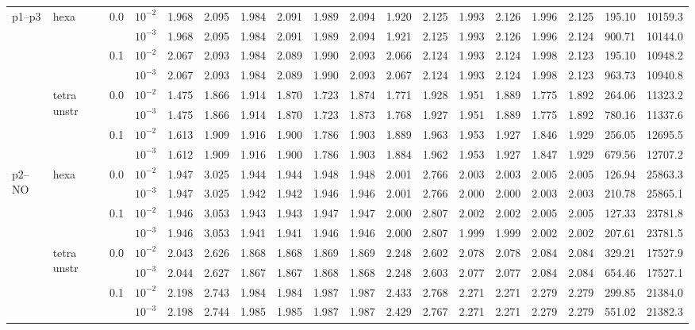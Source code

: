\begin{longtable}{llclrrrrrrrrrrrrrr}
\multirow{8}{*}{p1--p3} & \multirow{4}{*}{hexa} & \multirow{2}{*}{0.0} & $10^{-2}$ & 1.968 & 2.095 & 1.984 & 2.091 & 1.989 & 2.094 & 1.920 & 2.125 & 1.993 & 2.126 & 1.996 & 2.125 & 195.10 & 10159.3 \\
& & & $10^{-3}$ & 1.968 & 2.095 & 1.984 & 2.091 & 1.989 & 2.094 & 1.921 & 2.125 & 1.993 & 2.126 & 1.996 & 2.124 & 900.71 & 10144.0 \\\cline{3-18}
& & \multirow{2}{*}{0.1} & $10^{-2}$ & 2.067 & 2.093 & 1.984 & 2.089 & 1.990 & 2.093 & 2.066 & 2.124 & 1.993 & 2.124 & 1.998 & 2.123 & 195.10 & 10948.2 \\
& & & $10^{-3}$ & 2.067 & 2.093 & 1.984 & 2.089 & 1.990 & 2.093 & 2.067 & 2.124 & 1.993 & 2.124 & 1.998 & 2.123 & 963.73 & 10940.8 \\\cline{2-18}
& \multirow{4}{*}{tetra unstr} & \multirow{2}{*}{0.0} & $10^{-2}$ & 1.475 & 1.866 & 1.914 & 1.870 & 1.723 & 1.874 & 1.771 & 1.928 & 1.951 & 1.889 & 1.775 & 1.892 & 264.06 & 11323.2 \\
& & & $10^{-3}$ & 1.475 & 1.866 & 1.914 & 1.870 & 1.723 & 1.873 & 1.768 & 1.927 & 1.951 & 1.889 & 1.775 & 1.892 & 780.16 & 11337.6 \\\cline{3-18}
& & \multirow{2}{*}{0.1} & $10^{-2}$ & 1.613 & 1.909 & 1.916 & 1.900 & 1.786 & 1.903 & 1.889 & 1.963 & 1.953 & 1.927 & 1.846 & 1.929 & 256.05 & 12695.5 \\
& & & $10^{-3}$ & 1.612 & 1.909 & 1.916 & 1.900 & 1.786 & 1.903 & 1.884 & 1.962 & 1.953 & 1.927 & 1.847 & 1.929 & 679.56 & 12707.2 \\\hline

\multirow{8}{*}{p2--NO} & \multirow{4}{*}{hexa} & \multirow{2}{*}{0.0} & $10^{-2}$ & 1.947 & 3.025 & 1.944 & 1.944 & 1.948 & 1.948 & 2.001 & 2.766 & 2.003 & 2.003 & 2.005 & 2.005 & 126.94 & 25863.3 \\
& & & $10^{-3}$ & 1.947 & 3.025 & 1.942 & 1.942 & 1.946 & 1.946 & 2.001 & 2.766 & 2.000 & 2.000 & 2.003 & 2.003 & 210.78 & 25865.1 \\\cline{3-18}
& & \multirow{2}{*}{0.1} & $10^{-2}$ & 1.946 & 3.053 & 1.943 & 1.943 & 1.947 & 1.947 & 2.000 & 2.807 & 2.002 & 2.002 & 2.005 & 2.005 & 127.33 & 23781.8 \\
& & & $10^{-3}$ & 1.946 & 3.053 & 1.941 & 1.941 & 1.946 & 1.946 & 2.000 & 2.807 & 1.999 & 1.999 & 2.002 & 2.002 & 207.61 & 23781.5 \\\cline{2-18}
& \multirow{4}{*}{tetra unstr} & \multirow{2}{*}{0.0} & $10^{-2}$ & 2.043 & 2.626 & 1.868 & 1.868 & 1.869 & 1.869 & 2.248 & 2.602 & 2.078 & 2.078 & 2.084 & 2.084 & 329.21 & 17527.9 \\
& & & $10^{-3}$ & 2.044 & 2.627 & 1.867 & 1.867 & 1.868 & 1.868 & 2.248 & 2.603 & 2.077 & 2.077 & 2.084 & 2.084 & 654.46 & 17527.1 \\\cline{3-18}
& & \multirow{2}{*}{0.1} & $10^{-2}$ & 2.198 & 2.743 & 1.984 & 1.984 & 1.987 & 1.987 & 2.433 & 2.768 & 2.271 & 2.271 & 2.279 & 2.279 & 299.85 & 21384.0 \\
& & & $10^{-3}$ & 2.198 & 2.744 & 1.985 & 1.985 & 1.987 & 1.987 & 2.429 & 2.767 & 2.271 & 2.271 & 2.279 & 2.279 & 551.02 & 21382.3 \\\hline


\end{longtable}
